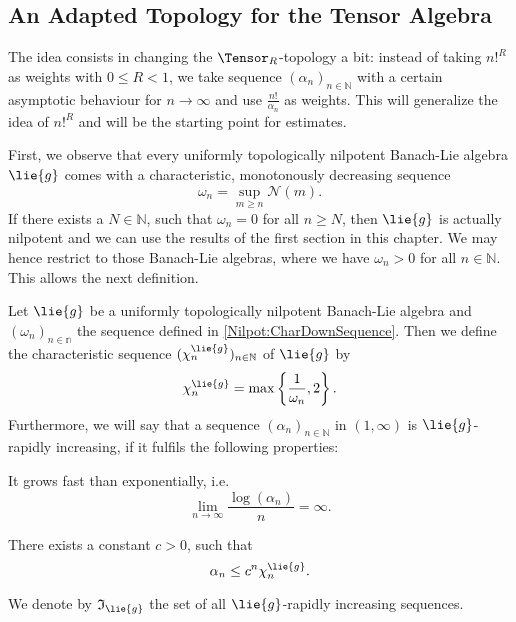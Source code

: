 \subsection{An Adapted Topology for the Tensor Algebra}

The idea consists in changing the $\Tensor_R$-topology a bit: instead of taking 
$n!^R$ as weights with $0 \leq R < 1$, we take sequence $(\alpha_n)_{n \in 
\mathbb{N}}$ with a certain asymptotic 
behaviour for $n \longrightarrow \infty$ and use $\frac{n!}{\alpha_n}$ as 
weights. This will generalize the idea of $n!^R$ and will be the starting point 
for estimates.

First, we observe that every uniformly topologically nilpotent Banach-Lie 
algebra $\lie{g}$ comes with a characteristic, monotonously decreasing sequence
\begin{equation}
	\label{Nilpot:CharDownSequence}
	\omega_n
	=
	\sup_{m \geq n} \mathcal{N}(m).	
\end{equation}
If there exists a $N \in \mathbb{N}$, such that $\omega_n = 0$ for all $n \geq 
N$, then $\lie{g}$ is actually nilpotent and we can use the results of the 
first section in this chapter. We may hence restrict to those Banach-Lie 
algebras, where we have $\omega_n > 0$ for all $n \in \mathbb{N}$. This allows 
the next definition.
\begin{definition}
	Let $\lie{g}$ be a uniformly topologically nilpotent Banach-Lie algebra and 
	$(\omega_n)_{n \in \mathbb{n}}$ the sequence defined in 
	\eqref{Nilpot:CharDownSequence}. Then we 
	define the characteristic sequence $(\chi_n^{\lie{g}})_{n \in \mathbb{N}}$ 
	of $\lie{g}$ by
	\begin{equation}
		\label{Nilpot:CharSequence}
		\chi_n^{\lie{g}}
		=
		\max
		\left\{ 
			\frac{1}{\omega_n}
			,
			2
		\right\}.
	\end{equation}
	Furthermore, we will say that a sequence $(\alpha_n)_{n \in \mathbb{N}}$ in 
	$(1, \infty)$ is $\lie{g}$-rapidly increasing, if it fulfils the following 
	properties:
	\begin{definitionlist}
		\item
		It grows fast than exponentially, i.e.
		\begin{equation*}
			\lim_{n \longrightarrow \infty}
			\frac{\log \left(\alpha_n \right)}{n}
			=
			\infty.
		\end{equation*}
		
		\item
		There exists a constant $c > 0$, such that
		\begin{equation*}
			\alpha_n 
			\leq 
			c^n  \chi_n^{\lie{g}}.
		\end{equation*}
	\end{definitionlist}
	We denote by $\mathfrak{I}_{\lie{g}}$ the set of all $\lie{g}$-rapidly 
	increasing sequences.
\end{definition}
